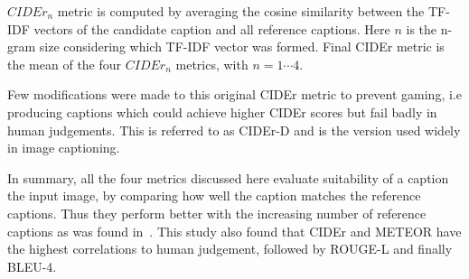 $CIDEr_n$ metric is computed by averaging the cosine similarity between
the TF-IDF vectors of the candidate caption and all reference captions.
Here $n$ is the n-gram size considering which TF-IDF vector was formed.
Final CIDEr metric is the mean of the four $CIDEr_n$ metrics, with $n=1\cdots4$.

Few modifications were made to this original CIDEr metric to prevent gaming, i.e
producing captions which could achieve higher CIDEr scores but fail badly in
human judgements.
This is referred to as CIDEr-D and is the version used widely in image
captioning.


In summary, all the four metrics discussed here evaluate suitability of a
caption the input image, by comparing how well the caption matches the reference
captions.
Thus they perform better with the increasing number of reference captions as was
found in~\cite{Vedantam_2015_CVPR}.
This study also found that CIDEr and METEOR have the highest correlations to
human judgement, followed by ROUGE-L and finally BLEU-4.

